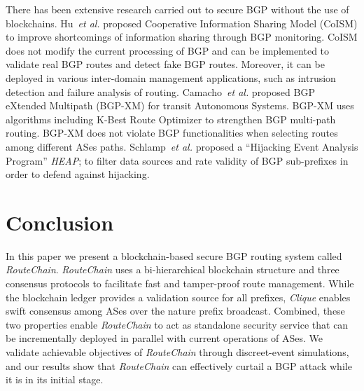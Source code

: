 \documentclass[5p]{elsarticle}
\newcommand{\BfPara}[1]{{\noindent\bf#1.}\xspace}
\newcommand{\rc}{{{\em RouteChain}}\xspace}
\newcommand{\etal}{{\em et al.}\xspace}
\begin{document}
There has been extensive research carried out to secure BGP without the use of blockchains. Hu~\etal\cite{HuWL15} proposed Cooperative Information Sharing Model (CoISM) to improve shortcomings of information sharing through BGP monitoring. CoISM does not modify the current processing of BGP and can be implemented to validate real BGP routes and detect fake BGP routes. Moreover, it can be deployed in various inter-domain management applications, such as intrusion detection and failure analysis of routing. Camacho~\etal\cite{CamachoGBV13} proposed BGP eXtended Multipath (BGP-XM) for transit Autonomous Systems. BGP-XM uses algorithms including K-Best Route Optimizer  to strengthen BGP multi-path routing. BGP-XM does not violate BGP functionalities when selecting routes among different ASes paths. Schlamp~\etal\cite{SchlampHJCB16} proposed a ``Hijacking Event Analysis Program'' {\em HEAP}; to filter data sources and rate validity of BGP sub-prefixes in order to defend against hijacking. 





\section{Conclusion}\label{sec:conclusion}
In this paper we present a blockchain-based secure BGP routing system called \rc. \rc uses a bi-hierarchical blockchain structure and three consensus protocols to facilitate fast and tamper-proof route management. While the blockchain ledger provides a validation source for all prefixes, {\em Clique} enables swift consensus among ASes over the nature prefix broadcast. Combined, these two properties enable \rc to act as standalone security service that can be incrementally deployed in parallel with current operations of ASes. We validate achievable objectives of \rc through discreet-event simulations, and our results show that \rc can effectively curtail a BGP attack while it is in its initial stage.  







\end{document}
